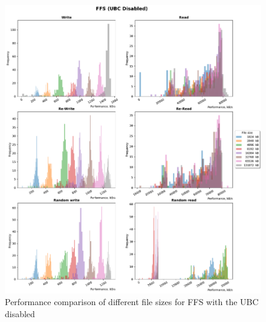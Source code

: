 \begin{figure}[!htb]
	\label{fig:bench_ffs_without_cache}
	\begin{center}
		\includegraphics[width=1.0\textwidth]{figures.nosync/benchmarking/FFS/FFS-UBC Disabled-hist.pdf}
	\end{center}
	\caption{Performance comparison of different file sizes for FFS with the UBC disabled}
\end{figure}



